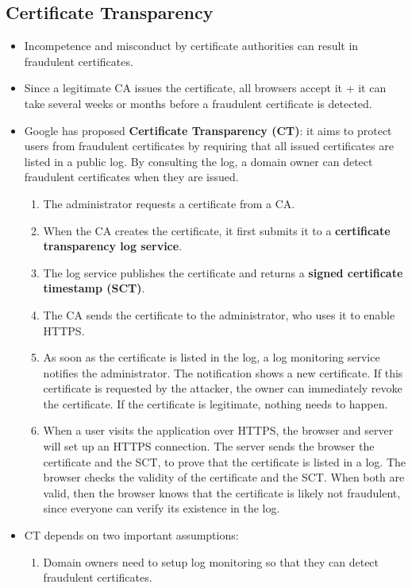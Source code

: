\documentclass[../main.tex]{subfiles}
\begin{document}
\subsection{Certificate Transparency}
\begin{itemize}
\item Incompetence and misconduct by certificate authorities can result in fraudulent certificates.
\item Since a legitimate CA issues the certificate, all browsers accept it + it can take several weeks or months before a fraudulent certificate is detected.
\item Google has proposed \textbf{Certificate Transparency (CT)}: it aims to protect users from fraudulent certificates by requiring that all issued certificates are listed in a public log. By consulting the log, a domain owner can detect fraudulent certificates when they are issued.
\begin{enumerate}
\item The administrator requests a certificate from a CA.
\item When the CA creates the certificate, it first submits it to a \textbf{certificate transparency log service}.
\item The log service publishes the certificate and returns a \textbf{signed certificate timestamp (SCT)}.
\item The CA sends the certificate to the administrator, who uses it to enable HTTPS.
\item As soon as the certificate is listed in the log, a log monitoring service notifies the administrator. The notification shows a new certificate. If this certificate is requested by the attacker, the owner can immediately revoke the certificate. If the certificate is legitimate, nothing needs to happen.
\item When a user visits the application over HTTPS, the browser and server will set up an HTTPS connection. The server sends the browser the certificate and the SCT, to prove that the certificate is listed in a log. The browser checks the validity of the certificate and the SCT. When both are valid, then the browser knows that the certificate is likely not fraudulent, since everyone can verify its existence in the log.
\end{enumerate}
\item CT depends on two important assumptions:
\begin{enumerate}
\item Domain owners need to setup log monitoring so that they can detect fraudulent certificates.

\end{enumerate}
\end{itemize}
\end{document}
